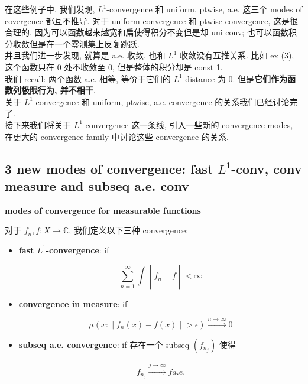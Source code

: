 \documentclass{qlnotes-export}
\begin{document}
在这些例子中, 我们发现, \(L^{1}\)-convergence 和 uniform, ptwise, a.e. 这三个 modes of covergence 都互不推导. 对于 uniform convergence 和 ptwise convergence, 这是很合理的, 因为可以函数越来越宽和扁使得积分不变但是却 uni conv; 也可以函数积分收敛但是在一个零测集上反复跳跃.\\
并且我们进一步发现, 就算是 a.e. 收敛, 也和 \(L^{1}\) 收敛没有互推关系. 比如 ex (3), 这个函数只在 \(0\) 处不收敛至 0, 但是整体的积分却是 const 1.\\
我们 recall: 两个函数 a.e. 相等, 等价于它们的 \(L^{1}\) distance 为 0. 但是\textbf{它们作为函数列极限行为, 并不相干}.\\
关于 \(L^{1}\)-convergence 和 uniform, ptwise, a.e. convergence 的关系我们已经讨论完了.\\
接下来我们将关于 \(L^{1}\)-convergence 这一条线, 引入一些新的 convergence modes, 在更大的 convergence family 中讨论这些 convergence 的关系.

\subsection{\texorpdfstring{3 new modes of convergence: fast \(L^{1}\)-conv, conv measure and subseq a.e. conv}{3 new modes of convergence: fast L\^{}\{1\}-conv, conv measure and subseq a.e. conv}}\label{new-modes-of-convergence-fast-l1-conv-conv-measure-and-subseq-a.e.-conv}

\begin{definition}{\protect{}\label{kn-modes-of-convergence-for-functions}{\textbf{modes
of convergence for measurable functions}}}

对于 \(f_{n},f:X\rightarrow{\mathbb{C}}\), 我们定义以下三种 convergence:

\begin{itemize}
\item
  \textbf{fast \(L^{1}\)-convergence}: if

  \[\left. \sum\limits_{n = 1}^{\infty}\int \middle| f_{n} - f \middle| < \infty \right.\]
\item
  \textbf{convergence in measure}: if

  \[\left. \mu(x: \middle| f_{n}(x) - f(x) \middle| > \epsilon)\overset{n\rightarrow\infty}{\rightarrow}0 \right.\]
\item
  \textbf{subseq a.e. convergence}: if 存在一个 subseq \((f_{n_{j}})\) 使得

  \[f_{n_{j}}\overset{j\rightarrow\infty}{\rightarrow}f a.e.\]
\end{itemize}

\end{definition}
\end{document}
